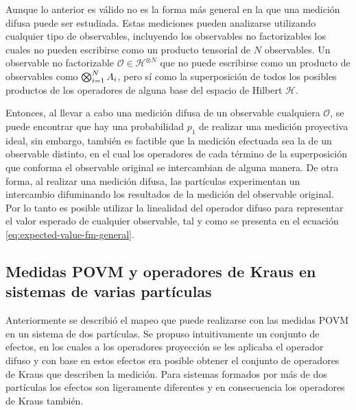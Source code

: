 Aunque lo anterior es válido no es la forma más general en la que una medición
difusa puede ser estudiada. Estas mediciones pueden analizarse utilizando
cualquier tipo de observables, incluyendo los observables no factorizables los
cuales no pueden escribirse como un producto tensorial de $N$ observables. Un
observable no factorizable $\mathcal{O}\in \mathcal{H}^{\otimes N}$ que no
puede escribirse como un producto de observables como $\bigotimes_{i=1}^{N} A_i$, pero
sí como la superposición de todos los posibles productos de los operadores de
alguna base del espacio de Hilbert $\mathcal{H}$. 


Entonces, al llevar a cabo una medición difusa de un observable cualquiera
$\mathcal{O}$, se puede encontrar que hay una probabilidad $p_1$ de realizar
una medición proyectiva ideal, sin embargo, también es factible que la medición
efectuada sea la de un observable distinto, en el cual los operadores de cada
término de la superposición que conforma el observable original se intercambian
de alguna manera.  De otra forma, al realizar una medición difusa, las
partículas experimentan un intercambio difuminando los resultados de  la
medición del observable original. Por lo tanto es posible utilizar la
linealidad del operador difuso  para representar el valor esperado de cualquier
observable, tal y como se presenta en el ecuación
{\eqref{eq:expected-value-fm-general}}.
\subsection{Medidas POVM y operadores de Kraus en sistemas de varias partículas} %

Anteriormente se describió el mapeo que puede realizarse con las medidas POVM
en un sistema de dos partículas. Se propuso intuitivamente un conjunto de
efectos, en los cuales a los operadores proyección se les aplicaba el operador
difuso y con base en estos efectos era posible obtener el conjunto de
operadores de Kraus que describen la medición. Para sistemas formados por más
de dos partículas los efectos son ligeramente diferentes y en consecuencia los
operadores de Kraus también.

